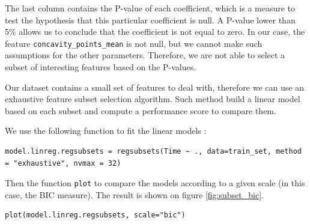 \documentclass[]{report}
\begin{document}
The last column contains the P-value of each coefficient, which is a measure to test the hypothesis that this particular coefficient is null. A P-value lower than 5\% allows us to conclude that the coefficient is not equal to zero. In our case, the feature \texttt{concavity\_points\_mean} is not null, but we cannot make such assumptions for the other parameters. Therefore, we are not able to select a subset of interesting features based on the P-values.

Our dataset contains a small set of features to deal with, therefore we can use an exhaustive feature subset selection algorithm. Such method build a linear model based on each subset and compute a performance score to compare them. 

We use the following function to fit the linear models :
\begin{lstlisting}
model.linreg.regsubsets = regsubsets(Time ~ ., data=train_set, method = "exhaustive", nvmax = 32)
\end{lstlisting}

Then the function \texttt{plot} to compare the models according to a given scale (in this case, the BIC measure). The result is shown on figure \ref{fig:subset_bic}.
\begin{lstlisting}
plot(model.linreg.regsubsets, scale="bic")	
\end{lstlisting}

\end{document}
